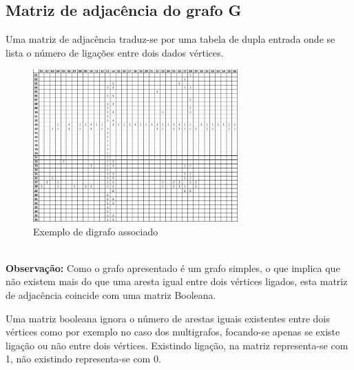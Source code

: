 \subsection{ Matriz de adjacência do grafo G }
Uma matriz de adjacência traduz-se por uma tabela de dupla entrada onde se lista o número de ligações 
entre dois dados vértices.
\begin{figure}[h]
    \centering
    \includegraphics[width=0.7\textwidth]{imgs/FiguraMatrizdeAdj}
    \caption{Exemplo de digrafo associado\label{fig:imagem14}}
\end{figure}\\
\textbf{Observação:} Como o grafo apresentado é um grafo simples, o que implica que não existem mais do que 
uma aresta igual entre dois vértices ligados, esta matriz de adjacência coincide com uma matriz Booleana.\par
Uma matriz booleana ignora o número de arestas iguais existentes entre dois vértices como por exemplo 
no caso dos multigrafos, focando-se apenas se existe ligação ou não entre dois vértices. Existindo ligação, na 
matriz representa-se com 1, não existindo representa-se com 0.\\

